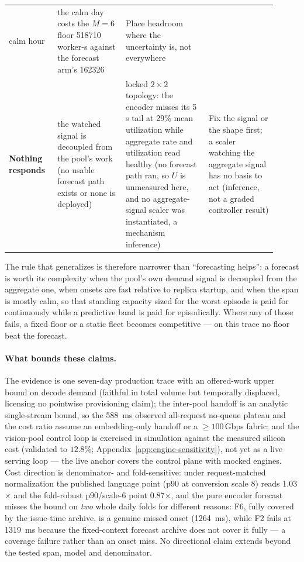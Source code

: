 \begin{table}[htbp]
\begin{tabular}{@{}p{0.155\linewidth}p{0.235\linewidth}p{0.29\linewidth}p{0.235\linewidth}@{}}
calm hour &
the calm day costs the $M{=}6$ floor \SI{518710}{} worker-s against the
forecast arm's \SI{162326}{} &
Place headroom where the uncertainty is, not everywhere \\
\addlinespace
\textbf{Nothing responds} &
the watched signal is decoupled from the pool's work (no usable forecast
path exists or none is deployed) &
locked $2{\times}2$ topology: the encoder misses its 5\,s tail at 29\%
mean utilization while aggregate rate and utilization read healthy (no
forecast path ran, so $U$ is unmeasured here, and no aggregate-signal scaler
was instantiated, a mechanism inference) &
Fix the signal or the shape first; a scaler watching the aggregate signal
has no basis to act (inference, not a graded controller result) \\
\bottomrule
\end{tabular}
\end{table}

The rule that generalizes is therefore narrower than ``forecasting helps'':
a forecast is worth its complexity when the pool's own demand signal is
decoupled from the aggregate one, when onsets are fast relative to replica
startup, and when the span is mostly calm, so that standing capacity
sized for the worst episode is paid for continuously while a predictive band
is paid for episodically. Where any of those fails, a fixed floor or a
static fleet becomes competitive --- on this trace no floor beat the
forecast.

\paragraph{What bounds these claims.} The evidence is one seven-day
production trace with an offered-work upper bound on decode demand
(faithful in total volume but temporally displaced, licensing no pointwise
provisioning claim); the inter-pool handoff is an analytic single-stream
bound, so the \SI{588}{\milli\second} observed all-request no-queue plateau
and the cost ratio assume an embedding-only handoff or a ${\geq}100$\,Gbps
fabric; and the vision-pool control loop is exercised in simulation against
the measured silicon cost (validated to $12.8\%$;
Appendix~\ref{app:engine-sensitivity}), not yet as a live serving loop ---
the live anchor covers the control plane with mocked engines. Cost direction
is denominator- and fold-sensitive: under request-matched normalization the
published language point (p90 at conversion scale 8) reads 1.03$\times$ and
the fold-robust p90/scale-6 point 0.87$\times$, and the pure encoder forecast
misses the bound on \emph{two} whole daily folds for different reasons: F6,
fully covered by the issue-time archive, is a genuine missed onset
(\SI{1264}{\milli\second}), while F2 fails at \SI{1319}{\milli\second} because
the fixed-context forecast archive does not cover it fully --- a coverage
failure rather than an onset miss. No directional claim extends beyond the
tested span, model and denominator.

